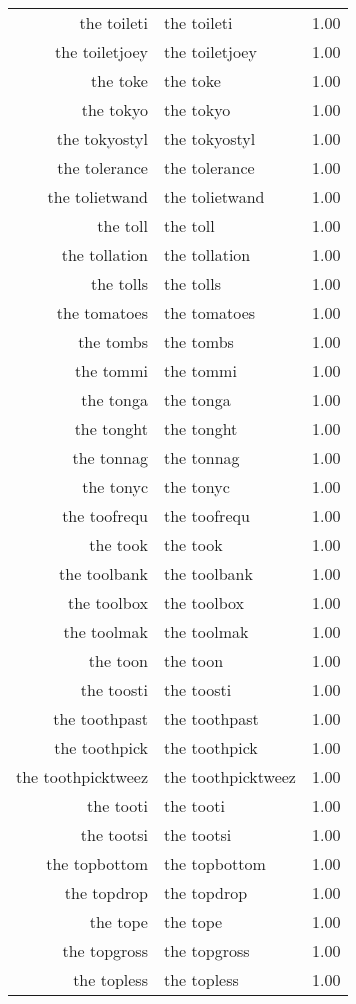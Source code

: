 \begin{table}[ht]
\begin{tabular}{rlr}
  the toileti & the toileti & 1.00 \\ 
  the toiletjoey & the toiletjoey & 1.00 \\ 
  the toke & the toke & 1.00 \\ 
  the tokyo & the tokyo & 1.00 \\ 
  the tokyostyl & the tokyostyl & 1.00 \\ 
  the tolerance & the tolerance & 1.00 \\ 
  the tolietwand & the tolietwand & 1.00 \\ 
  the toll & the toll & 1.00 \\ 
  the tollation & the tollation & 1.00 \\ 
  the tolls & the tolls & 1.00 \\ 
  the tomatoes & the tomatoes & 1.00 \\ 
  the tombs & the tombs & 1.00 \\ 
  the tommi & the tommi & 1.00 \\ 
  the tonga & the tonga & 1.00 \\ 
  the tonght & the tonght & 1.00 \\ 
  the tonnag & the tonnag & 1.00 \\ 
  the tonyc & the tonyc & 1.00 \\ 
  the toofrequ & the toofrequ & 1.00 \\ 
  the took & the took & 1.00 \\ 
  the toolbank & the toolbank & 1.00 \\ 
  the toolbox & the toolbox & 1.00 \\ 
  the toolmak & the toolmak & 1.00 \\ 
  the toon & the toon & 1.00 \\ 
  the toosti & the toosti & 1.00 \\ 
  the toothpast & the toothpast & 1.00 \\ 
  the toothpick & the toothpick & 1.00 \\ 
  the toothpicktweez & the toothpicktweez & 1.00 \\ 
  the tooti & the tooti & 1.00 \\ 
  the tootsi & the tootsi & 1.00 \\ 
  the topbottom & the topbottom & 1.00 \\ 
  the topdrop & the topdrop & 1.00 \\ 
  the tope & the tope & 1.00 \\ 
  the topgross & the topgross & 1.00 \\ 
  the topless & the topless & 1.00 \\ 

\end{tabular}
\end{table}

